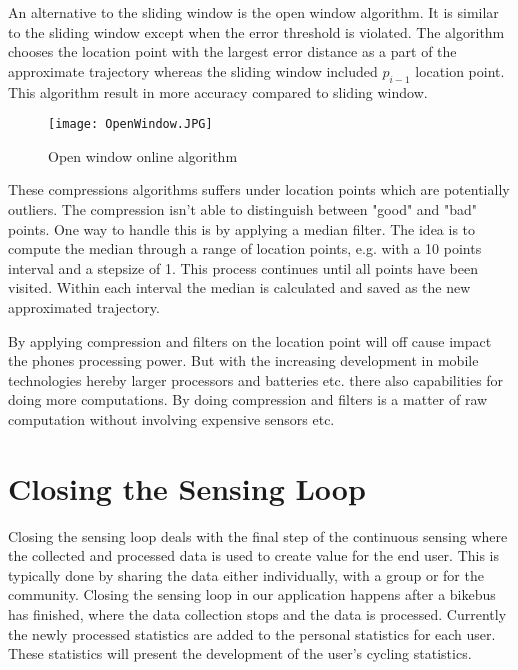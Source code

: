 An alternative to the sliding window is the open window algorithm. It is similar to the sliding window except when the error threshold is violated. The algorithm chooses the location point with the largest error distance as a part of the approximate trajectory whereas the sliding window included $p_{i-1}$ location point. This algorithm result in more accuracy compared to sliding window. 

\begin{figure}[H]
\centering
\texttt{[image: OpenWindow.JPG]}

\caption{Open window online algorithm}
\label{fig:open_window_algorithm}
\end{figure}

These compressions algorithms suffers under location points which are potentially outliers. The compression isn't able to distinguish between "good" and "bad" points. One way to handle this is by applying a median filter. The idea is to compute the median through a range of location points, e.g. with a 10 points interval and a stepsize of 1. This process continues until all points have been visited. Within each interval the median is calculated and saved as the new approximated trajectory.

By applying compression and filters on the location point will off cause impact the phones processing power. But with the increasing development in mobile technologies hereby larger processors and batteries etc. there also capabilities for doing more computations. By doing compression and filters is a matter of raw computation without involving expensive sensors etc.       
\iffalse
Suggestions for further processing:
\begin{itemize}
    \item Median filtering
    \item Advanced statistics calculations (analyse per interval)
    \item Algorithm to balance the trade-off between processing space and time (Appendix \ref{app:processing_algorithm})
\end{itemize}
\fi

\section{Closing the Sensing Loop}
Closing the sensing loop deals with the final step of the continuous sensing where the collected and processed data is used to create value for the end user.
This is typically done by sharing the data either individually, with a group or for the community. 
Closing the sensing loop in our application happens after a bikebus has finished, where the data collection stops and the data is processed. Currently the newly processed statistics are added to the personal statistics for each user. These statistics will present the development of the user's cycling statistics.

